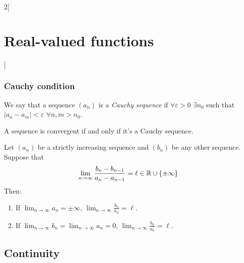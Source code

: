 \documentclass[../../../main.tex]{subfiles}
\begin{document}
\begin{multicols}{2}[\section{Real-valued functions}]
  \subsubsection{Cauchy condition}
  \begin{definition}
    We say that a sequence $(a_n)$ is a \textit{Cauchy sequence} if $\forall \varepsilon>0$ $\exists n_0$ such that $|a_n-a_m|<\varepsilon$ $\forall n,m>n_0$.
  \end{definition}
  \begin{theorem}
    A sequence is convergent if and only if it's a Cauchy sequence.
  \end{theorem}
  \begin{theorem}
    Let $(a_n)$ be a strictly increasing sequence and $(b_n)$ be any other sequence. Suppose that $$\lim_{n\to\infty}\frac{b_n-b_{n-1}}{a_n-a_{n-1}}=\ell\in\mathbb{R}\cup\{\pm\infty\}$$ Then:
    \begin{enumerate}
      \item If $\displaystyle\lim_{n\to\infty} a_n=\pm\infty$, $\displaystyle\lim_{n\to\infty}\frac{b_n}{a_n}=\ell$.
      \item If $\displaystyle\lim_{n\to\infty} b_n=\displaystyle\lim_{n\to\infty} a_n=0$, $\displaystyle\lim_{n\to\infty}\frac{b_n}{a_n}=\ell$.
    \end{enumerate}
  \end{theorem}
  \subsection{Continuity}

\end{multicols}
\end{document}
